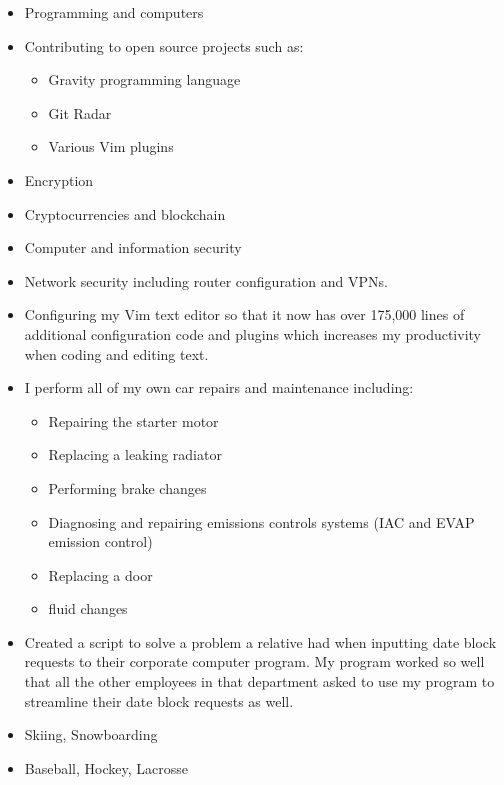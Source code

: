 \documentclass[]{friggeri-cv} %
\begin{document}
\begin{entrylist}
\interest
{
\begin{itemize}
\item Programming and computers
\item Contributing to open source projects such as:
  \begin{itemize}
    \item Gravity programming language
    \item Git Radar
    \item Various Vim plugins
  \end{itemize}
\item Encryption
\item Cryptocurrencies and blockchain
\item Computer and information security
\item Network security including router configuration and VPNs.
\item Configuring my Vim text editor so that it now has over 175,000 lines of
additional configuration code and plugins which increases my productivity when
coding and editing text.
\item I perform all of my own car repairs and maintenance including:
  \begin{itemize}
    \item Repairing the starter motor
    \item Replacing a leaking radiator
    \item Performing brake changes
    \item Diagnosing and repairing emissions controls systems (IAC and EVAP
    emission control)
    \item Replacing a door
    \item fluid changes
  \end{itemize}
\item Created a script to solve a problem a relative had when inputting date
block requests to their corporate computer program. My program worked so well
that all the other employees in that department asked to use my program to
streamline their date block requests as well.
\item Skiing, Snowboarding
\item Baseball, Hockey, Lacrosse
\end{itemize}
}
\end{entrylist}

\end{document}
